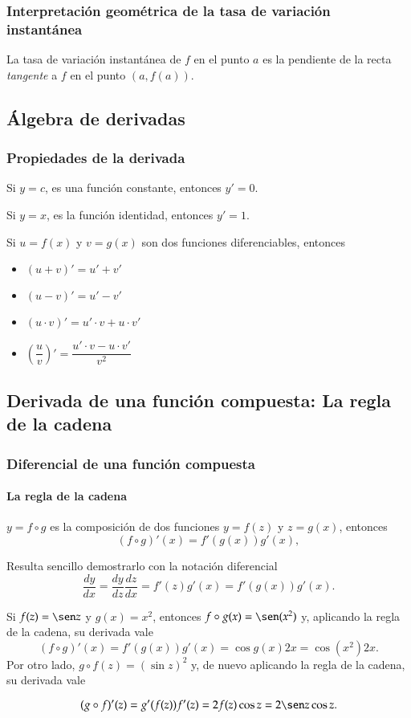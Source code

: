 \begin{frame}
\frametitle{Interpretación geométrica de la tasa de variación instantánea}
La tasa de variación instantánea de $f$ en el punto $a$ es la pendiente de la recta \emph{tangente} a $f$ en el punto $(a,f(a))$.
\begin{center}
\scalebox{1}{}
\end{center}
\end{frame}



\subsection{Álgebra de derivadas}
\begin{frame}
\frametitle{Propiedades de la derivada}
Si $y=c$, es una función constante, entonces $y'=0$.

Si $y=x$, es la función identidad, entonces  $y'=1$.

Si $u=f(x)$ y $v=g(x)$ son dos funciones diferenciables, entonces
\begin{itemize}
\item $(u+v)'=u'+v'$
\item $(u-v)'=u'-v'$
\item $(u\cdot v)'=u'\cdot v+ u\cdot v'$
\item $\left(\dfrac{u}{v}\right)'=\dfrac{u'\cdot v-u\cdot v'}{v^2}$
\end{itemize}
\end{frame}


\subsection{Derivada de una función compuesta: La regla de la cadena}

\begin{frame}
\frametitle{Diferencial de una función compuesta}
\framesubtitle{La regla de la cadena}
\begin{teorema}
$y=f\circ g$ es la composición de dos funciones $y=f(z)$ y $z=g(x)$, entonces
\[
(f\circ g)'(x)=f'(g(x))g'(x), 
\]
\end{teorema}

Resulta sencillo demostrarlo con la notación diferencial
\[
\frac{dy}{dx}=\frac{dy}{dz}\frac{dz}{dx}=f'(z)g'(x)=f'(g(x))g'(x).
\]

 Si $f(z)=\sen z$ y $g(x)=x^2$, entonces $f\circ g(x)=\sen(x^2)$ y, aplicando la regla de la cadena, su derivada
vale
\[
(f\circ g)'(x)=f'(g(x))g'(x) = \cos g(x) 2x = \cos(x^2)2x. 
\]
Por otro lado, $g\circ f(z)= (\sin z)^2$ y, de nuevo aplicando la regla de la cadena, su derivada vale

\[
(g\circ f)'(z)=g'(f(z))f'(z) = 2f(z)\cos z = 2\sen z\cos z. 
\]
\end{frame}



